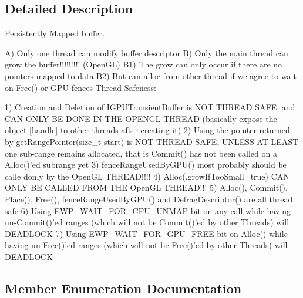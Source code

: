 \subsection{Detailed Description}
Persistently Mapped buffer. 

A) Only one thread can modify buffer descriptor B) Only the main thread can grow the buffer!!!!!!!!! (Open\+GL) B1) The grow can only occur if there are no pointers mapped to data B2) But can alloc from other thread if we agree to wait on \hyperlink{classirr_1_1video_1_1IGPUTransientBuffer_aa575e8d02383688f671e1ed818790d17}{Free()} or G\+PU fences Thread Safeness\+: \begin{DoxyVerb}1) Creation and Deletion of IGPUTransientBuffer is NOT THREAD SAFE, and CAN ONLY BE DONE IN THE OPENGL THREAD
    (basically expose the object [handle] to other threads after creating it)
2) Using the pointer returned by getRangePointer(size_t start) is NOT THREAD SAFE,
    UNLESS AT LEAST one sub-range remains allocated, that is Commit() has not been called on a Alloc()'ed subrange yet
3) fenceRangeUsedByGPU() most probably should be calle donly by the OpenGL THREAD!!!!
4) Alloc(,growIfTooSmall=true) CAN ONLY BE CALLED FROM THE OpenGL THREAD!!!
5) Alloc(), Commit(), Place(), Free(), fenceRangeUsedByGPU() and DefragDescriptor() are all thread safe
6) Using EWP_WAIT_FOR_CPU_UNMAP bit on any call while having un-Commit()'ed ranges (which will not be Commit()'ed by other Threads) will DEADLOCK
7) Using EWP_WAIT_FOR_GPU_FREE bit on Alloc() while having un-Free()'ed ranges (which will not be Free()'ed by other Threads) will DEADLOCK\end{DoxyVerb}
 

\subsection{Member Enumeration Documentation}
